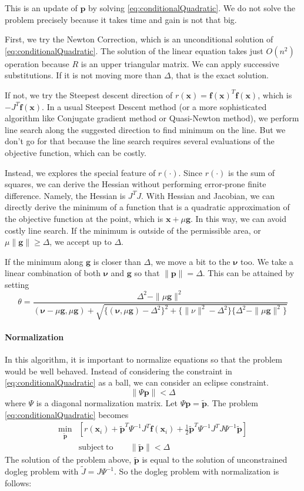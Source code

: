 \documentclass[12pt]{article}
\def\min#1{{\underset{#1}{\mathrm{min}}}}
\def\xb{{\mathbf{x}}}
\def\fb{{\mathbf{f}}}
\def\nub{{\mathbf{\nu}}}
\def\gb{{\mathbf{g}}}
\def\pb{{\mathbf{p}}}
\begin{document}
This is an update of $\pb$ by solving \eqref{eq:conditionalQuadratic}. We do not solve the problem
precisely because it takes time and gain is not that big. 

First, we try the Newton Correction, which is an unconditional solution of \eqref{eq:conditionalQuadratic}. The solution of the
linear equation takes just $O(n^2)$ operation because $R$ is an upper triangular matrix. We can apply
successive substitutions. If it is not moving more than $\Delta$, that is the exact solution. 

If not, we try the Steepest descent direction of $r(\xb)=\fb(\xb)^T\fb(\xb)$, which is $-J^T
\fb(\xb)$. 
In a usual Steepest Descent method (or a more sophisticated algorithm like Conjugate
gradient method or Quasi-Newton method), we perform line search along the suggested direction to
find minimum on the line. But we don't go for that because the line search requires several
evaluations of the objective function, which can be costly. 

Instead, we explores the special feature of $r(\cdot)$. Since $r(\cdot)$ is the sum of squares, we can derive the Hessian without
performing error-prone finite difference. Namely, the Hessian is $J^TJ$. With Hessian and
Jacobian, we can directly derive the minimum of a function that is a quadratic approximation of
the objective function at the point, which is $\xb + \mu \gb$. In this way, we can avoid costly
line search. If the minimum is outside of the permissible area, or $\mu \|\gb\| \ge \Delta$, we
accept up to $\Delta$.

If the minimum along $\gb$ is closer than $\Delta$, we move a bit to the $\nub$ too. We take a
linear combination of both $\boldsymbol{\nu}$ and $\gb$ so that $\|\pb\| = \Delta$. This can be
attained by setting
\[
\theta = \frac{\Delta^2 - \|\mu \gb \|^2}
{(\nub-\mu\gb,\mu\gb)+\sqrt{\{(\nub,\mu\gb)-\Delta^2\}^2+\{\|\nu\|^2-\Delta^2\} \{\Delta^2-\|\mu\gb\|^2 \}}}
\]

\paragraph{Normalization}
In this algorithm, it is important to normalize equations so that the problem would be well
behaved. Instead of considering the constraint in \eqref{eq:conditionalQuadratic} as a ball, we
can consider an eclipse constraint. 
\[
 \|\Psi \pb\| < \Delta
\]
where  $\Psi$ is a diagonal normalization matrix. Let $\Psi \pb = \tilde{\pb}$. The problem
\eqref{eq:conditionalQuadratic} becomes
\begin{align}
\min{\tilde{\pb}} &\left[ r(\xb_i) +\tilde{\pb}^T\Psi^{-1} J^T\fb(\xb_i)  + 
    \frac{1}{2} \tilde{\pb}^T \Psi^{-1}J^TJ\Psi^{-1}\tilde{\pb}\right] 
\label{eq:conditionalQuadratic} \\
&\mathrm{subject \ to}\qquad \|\tilde{\pb}\| < \Delta
\end{align}
The solution of the problem above, $\tilde{\pb}$ is equal to the solution of unconstrained dogleg
problem with $\tilde{J} = J\Psi ^{-1}$. So the dogleg problem with normalization is follows:
\end{document}
